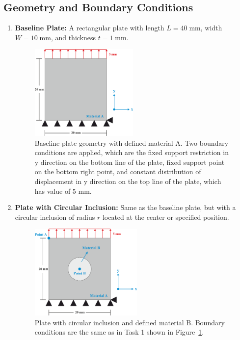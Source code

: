 \documentclass[12pt]{article}
\begin{document}
\subsection{Geometry and Boundary Conditions}
\begin{enumerate}
     \item \textbf{Baseline Plate:} A rectangular plate with length $L = 40 \;\text{mm}$, width $W = 10 \;\text{mm}$, and thickness $t = 1 \;\text{mm}$.
        \begin{figure}[H]
        \centering
            \includegraphics[width=0.5\textwidth]{images/TaskQ1.png}
        \caption{Baseline plate geometry with defined material A. Two boundary conditions are applied, which are the 
        fixed support restriction in y direction on the bottom line of the plate, fixed support point on the bottom right point,
        and constant distribution of displacement in y direction on the top line of the plate, which has value of 5 mm.}
        \label{fig:geometryQ1}
\end{figure}

    \item \textbf{Plate with Circular Inclusion:} Same as the baseline plate, but with a circular inclusion of radius $r$ located at the center or specified position.
\begin{figure}[H]
        \centering
            \includegraphics[width=0.52\textwidth]{images/TaskQ2.png}
        \caption{Plate with circular inclusion and defined material B. Boundary conditions are the same as in Task 1 shown in Figure~\ref{fig:geometryQ1}.}
        \label{fig:geometryQ2}
\end{figure}
\end{enumerate}
\end{document}
